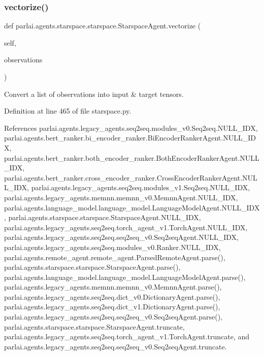 \subsubsection{\texorpdfstring{vectorize()}{vectorize()}}
{\footnotesize\ttfamily def parlai.\+agents.\+starspace.\+starspace.\+Starspace\+Agent.\+vectorize (\begin{DoxyParamCaption}\item[{}]{self,  }\item[{}]{observations }\end{DoxyParamCaption})}

\begin{DoxyVerb}Convert a list of observations into input & target tensors.\end{DoxyVerb}
 

Definition at line 465 of file starspace.\+py.



References parlai.\+agents.\+legacy\+\_\+agents.\+seq2seq.\+modules\+\_\+v0.\+Seq2seq.\+N\+U\+L\+L\+\_\+\+I\+DX, parlai.\+agents.\+bert\+\_\+ranker.\+bi\+\_\+encoder\+\_\+ranker.\+Bi\+Encoder\+Ranker\+Agent.\+N\+U\+L\+L\+\_\+\+I\+DX, parlai.\+agents.\+bert\+\_\+ranker.\+both\+\_\+encoder\+\_\+ranker.\+Both\+Encoder\+Ranker\+Agent.\+N\+U\+L\+L\+\_\+\+I\+DX, parlai.\+agents.\+bert\+\_\+ranker.\+cross\+\_\+encoder\+\_\+ranker.\+Cross\+Encoder\+Ranker\+Agent.\+N\+U\+L\+L\+\_\+\+I\+DX, parlai.\+agents.\+legacy\+\_\+agents.\+seq2seq.\+modules\+\_\+v1.\+Seq2seq.\+N\+U\+L\+L\+\_\+\+I\+DX, parlai.\+agents.\+legacy\+\_\+agents.\+memnn.\+memnn\+\_\+v0.\+Memnn\+Agent.\+N\+U\+L\+L\+\_\+\+I\+DX, parlai.\+agents.\+language\+\_\+model.\+language\+\_\+model.\+Language\+Model\+Agent.\+N\+U\+L\+L\+\_\+\+I\+DX, parlai.\+agents.\+starspace.\+starspace.\+Starspace\+Agent.\+N\+U\+L\+L\+\_\+\+I\+DX, parlai.\+agents.\+legacy\+\_\+agents.\+seq2seq.\+torch\+\_\+agent\+\_\+v1.\+Torch\+Agent.\+N\+U\+L\+L\+\_\+\+I\+DX, parlai.\+agents.\+legacy\+\_\+agents.\+seq2seq.\+seq2seq\+\_\+v0.\+Seq2seq\+Agent.\+N\+U\+L\+L\+\_\+\+I\+DX, parlai.\+agents.\+legacy\+\_\+agents.\+seq2seq.\+modules\+\_\+v0.\+Ranker.\+N\+U\+L\+L\+\_\+\+I\+DX, parlai.\+agents.\+remote\+\_\+agent.\+remote\+\_\+agent.\+Parsed\+Remote\+Agent.\+parse(), parlai.\+agents.\+starspace.\+starspace.\+Starspace\+Agent.\+parse(), parlai.\+agents.\+language\+\_\+model.\+language\+\_\+model.\+Language\+Model\+Agent.\+parse(), parlai.\+agents.\+legacy\+\_\+agents.\+memnn.\+memnn\+\_\+v0.\+Memnn\+Agent.\+parse(), parlai.\+agents.\+legacy\+\_\+agents.\+seq2seq.\+dict\+\_\+v0.\+Dictionary\+Agent.\+parse(), parlai.\+agents.\+legacy\+\_\+agents.\+seq2seq.\+dict\+\_\+v1.\+Dictionary\+Agent.\+parse(), parlai.\+agents.\+legacy\+\_\+agents.\+seq2seq.\+seq2seq\+\_\+v0.\+Seq2seq\+Agent.\+parse(), parlai.\+agents.\+starspace.\+starspace.\+Starspace\+Agent.\+truncate, parlai.\+agents.\+legacy\+\_\+agents.\+seq2seq.\+torch\+\_\+agent\+\_\+v1.\+Torch\+Agent.\+truncate, and parlai.\+agents.\+legacy\+\_\+agents.\+seq2seq.\+seq2seq\+\_\+v0.\+Seq2seq\+Agent.\+truncate.



